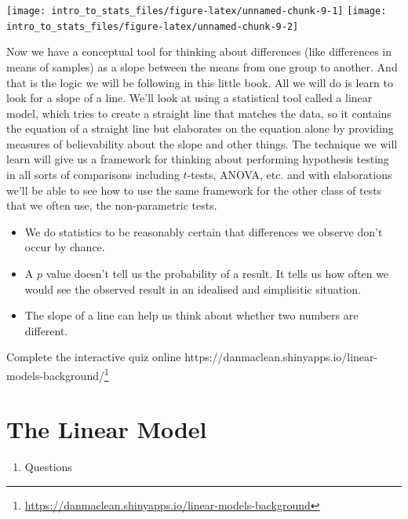 \documentclass[
]{book}
\providecommand{\tightlist}{%
  \setlength{\itemsep}{0pt}\setlength{\parskip}{0pt}}
\renewcommand{\href}[2]{#2\footnote{\url{#1}}}
\newenvironment{task}
{ \begin{tcolorbox}[title=For you to do,title filled] }
{  \end{tcolorbox} }
\newenvironment{roundup}
{ \begin{tcolorbox}[colbacktitle=yellow!50!white,
title=Round Up,coltitle=black,
fonttitle=\bfseries] }
{  \end{tcolorbox} }
\begin{document}
\texttt{[image: intro\_to\_stats\_files/figure-latex/unnamed-chunk-9-1]} \texttt{[image: intro\_to\_stats\_files/figure-latex/unnamed-chunk-9-2]}

Now we have a conceptual tool for thinking about differences (like differences in means of samples) as a slope between the means from one group to another. And that is the logic we will be following in this little book. All we will do is learn to look for a slope of a line. We'll look at using a statistical tool called a linear model, which tries to create a straight line that matches the data, so it contains the equation of a straight line but elaborates on the equation alone by providing measures of believability about the slope and other things. The technique we will learn will give us a framework for thinking about performing hypothesis testing in all sorts of comparisons including \(t\)-tests, ANOVA, etc. and with elaborations we'll be able to see how to use the same framework for the other class of tests that we often use, the non-parametric tests.

\begin{roundup}
\begin{itemize}
\tightlist
\item
  We do statistics to be reasonably certain that differences we observe don't occur by chance.
\item
  A \(p\) value doesn't tell us the probability of a result. It tells us how often we would see the observed result in an idealised and simplisitic situation.
\item
  The slope of a line can help us think about whether two numbers are different.
\end{itemize}
\end{roundup}

\begin{task}
Complete the interactive quiz online \href{https://danmaclean.shinyapps.io/linear-models-background}{https://danmaclean.shinyapps.io/linear-models-background/}
\end{task}

\hypertarget{the-linear-model}{%
\chapter{The Linear Model}\label{the-linear-model}}

\begin{enumerate}
\def\labelenumi{\arabic{enumi}.}
\tightlist
\item
  Questions
\end{enumerate}
\end{document}
